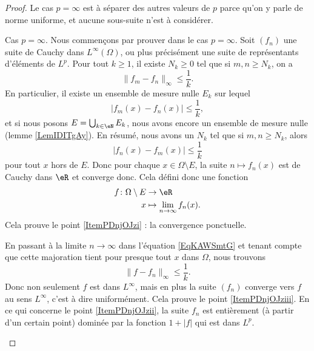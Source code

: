 \begin{proof}
    Le cas \( p=\infty\) est à séparer des autres valeurs de \( p\) parce qu'on y parle de norme uniforme, et aucune sous-suite n'est à considérer.
    \begin{subproof}
    \item[Cas \( p=\infty\).]
    Nous commençons par prouver dans le cas \( p=\infty\). Soit \( (f_n)\) une suite de Cauchy dans \( L^{\infty}(\Omega)\), ou plus précisément une suite de représentants d'éléments de \( L^p\). Pour tout \( k\geq 1\), il existe \( N_k\geq 0\) tel que si \( m,n\geq N_k\), on a
    \begin{equation}
        \| f_m-f_n \|_{\infty}\leq \frac{1}{ k }.
    \end{equation}
    En particulier, il existe un ensemble de mesure nulle \( E_k\) sur lequel
    \begin{equation}
        | f_m(x)-f_n(x) |\leq\frac{1}{ k },
    \end{equation}
    et si nous posons \( E=\bigcup_{k\in \eN}E_k\), nous avons encore un ensemble de mesure nulle (lemme \ref{LemIDITgAy}). En  résumé, nous avons un \( N_k\) tel que si \( m,n\geq N_k\), alors
    \begin{equation}    \label{EqKAWSmtG}
        | f_n(x)-f_m(x) |\leq \frac{1}{ k }
    \end{equation}
    pour tout \( x\) hors de \( E\). Donc pour chaque \( x\in\Omega\setminus E\), la suite \( n\mapsto f_n(x)\) est de Cauchy dans \( \eR\) et converge donc. Cela défini donc une fonction
    \begin{equation}
        \begin{aligned}
            f\colon \Omega\setminus E&\to \eR \\
            x&\mapsto \lim_{n\to \infty} f_n(x).
        \end{aligned}
    \end{equation}
    Cela prouve le point \ref{ItemPDnjOJzi} : la convergence ponctuelle.

    En passant à la limite \( n\to \infty\) dans l'équation \ref{EqKAWSmtG} et tenant compte que cette majoration tient pour presque tout \( x\) dans \( \Omega\), nous trouvons
    \begin{equation}
        \| f-f_n \|_{\infty}\leq \frac{1}{ k }.
    \end{equation}
    Donc non seulement \( f\) est dans \( L^{\infty}\), mais en plus la suite \( (f_n)\) converge vers \( f\) au sens \( L^{\infty}\), c'est à dire uniformément. Cela prouve le point \ref{ItemPDnjOJziii}. En ce qui concerne le point \ref{ItemPDnjOJzii}, la suite \( f_n\) est entièrement (à partir d'un certain point) dominée par la fonction \( 1+| f |\) qui est dans \( L^p\).


\end{subproof}
\end{proof}

